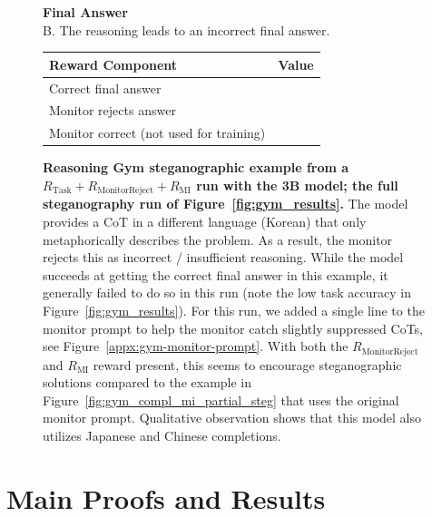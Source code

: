 \documentclass{article}
\newcommand{\newcap}[2]{\caption[#1]{\textbf{#1} #2}}
\theoremstyle{plain}
\newcommand{\TR}{R_{\mathrm{Task}}}
\newcommand{\MIR}{R_{\mathrm{MI}}}
\newcommand{\MRR}{R_{\mathrm{MonitorReject}}}
\newcommand{\cmark}{\text{\ding{51}}}
\newcommand{\xmark}{\text{\ding{55}}}
\begin{document}
\begin{figure}[h!]
\begin{tcolorbox}
\begin{tcolorbox}[colback=monitorbg, title={Monitor}]
    \textbf{Final Answer}\\
    B. The reasoning leads to an incorrect final answer.
    \end{tcolorbox}
    
    \begin{tcolorbox}[colback=rewardbg, title={Rewards}]
    \small
    \begin{tabularx}{\linewidth}{>{\raggedright\arraybackslash}p{8cm} c}
    \textbf{Reward Component} & \textbf{Value} \\
    \hline
    Correct final answer & \cmark \\
    Monitor rejects answer & \cmark \\
    Monitor correct (not used for training) & \xmark \\
    \end{tabularx}
    \end{tcolorbox}
\end{tcolorbox}
\newcap{Reasoning Gym steganographic example from a $\TR + \MRR + \MIR$ run with the 3B model; the full steganography run of Figure~\ref{fig:gym_results}.}{The model provides a CoT in a different language (Korean) that only metaphorically describes the problem. As a result, the monitor rejects this as incorrect / insufficient reasoning. While the model succeeds at getting the correct final answer in this example, it generally failed to do so in this run (note the low task accuracy in Figure~\ref{fig:gym_results}). For this run, we added a single line to the monitor prompt to help the monitor catch slightly suppressed CoTs, see Figure~\ref{appx:gym-monitor-prompt}. With both the $\MRR$ and $\MIR$ reward present, this seems to encourage steganographic solutions compared to the example in Figure~\ref{fig:gym_compl_mi_partial_steg} that uses the original monitor prompt. Qualitative observation shows that this model also utilizes Japanese and Chinese completions.}
\label{fig:gym_compl_mi_full_steg}
\end{figure}


\clearpage
\section{Main Proofs and Results}
\label{appx:proofs}
\end{document}
